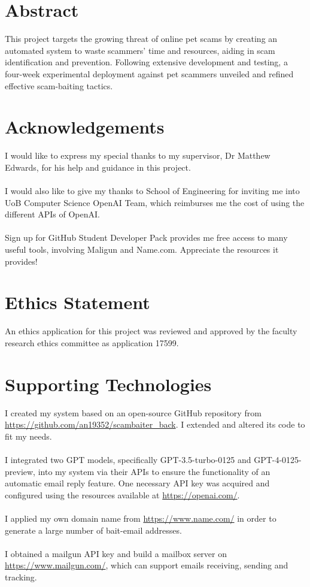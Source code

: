 \documentclass[ oneside,%
                    author={Cassie Qing Tang},
                    degree={BSc},
                     title={The Report for 3D Modelling of Queens Library \\ },
                    subtitle={ }]{dissertation}
\begin{document}
\maketitle
\fronmatter

\chapter*{Abstract}
This project targets the growing threat of online pet scams by creating an automated system to waste scammers' time and resources, aiding in scam identification and prevention. Following extensive development and testing, a four-week experimental deployment against pet scammers unveiled and refined effective scam-baiting tactics.

\chapter*{Acknowledgements}
I would like to express my special thanks to my supervisor, Dr Matthew Edwards, for his help and guidance in this project.
\\
\\
I would also like to give my thanks to School of Engineering for inviting me into UoB Computer Science OpenAI Team, which reimburses me the cost of using the different APIs of OpenAI.
\\
\\
Sign up for GitHub Student Developer Pack provides me free access to many useful tools, involving Maligun and Name.com. Appreciate the resources it provides!

\makedecl


\tableofcontents
\listoffigures
\listoftables

\chapter*{Ethics Statement}
An ethics application for this project was reviewed and approved by the faculty research ethics committee as application 17599.


\chapter*{Supporting Technologies}
I created my system based on an open-source GitHub repository from \url{https://github.com/an19352/scambaiter_back}. I extended and altered its code to fit my needs.
\\
\\
I integrated two GPT models, specifically GPT-3.5-turbo-0125 and GPT-4-0125-preview, into my system via their APIs to ensure the functionality of an automatic email reply feature. One necessary API key was acquired and configured using the resources available at \url{https://openai.com/}.
\\
\\
I applied my own domain name from \url{https://www.name.com/} in order to generate a large number of bait-email addresses.
\\
\\
I obtained a mailgun API key and build a mailbox server on \url{https://www.mailgun.com/}, which can support emails receiving, sending and tracking.
\end{document}
